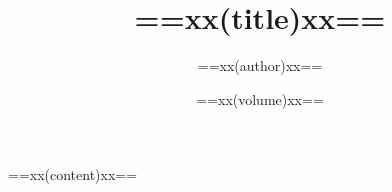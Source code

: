 \documentclass[geye, normal, black]{qiushi}
\title{==xx(title)xx==}
\author{==xx(author)xx==}
\date{==xx(volume)xx==}
\begin{document}
    \maketitle

    ==xx(content)xx==
\end{document}
